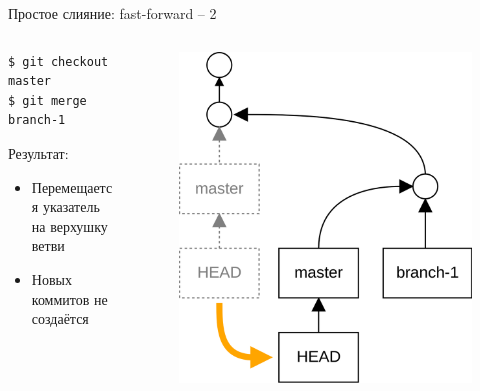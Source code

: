 \documentclass[presentation]{beamer}
\begin{document}
\begin{frame}[fragile]{Простое слияние: fast-forward -- 2}
  \begin{columns}
    \begin{column}{.4\textwidth}
\begin{verbatim}
$ git checkout master
$ git merge branch-1
\end{verbatim}
      Результат:
      \begin{itemize}
      \item Перемещается указатель на верхушку ветви
      \item Новых коммитов не создаётся
      \end{itemize}
      \end{column}
      \begin{column}{.6\textwidth}
        \begin{figure}[htb]
          \centering
          \includegraphics[height=.7\textheight]{git-operation-merge-1}
        \end{figure}
      \end{column}
    \end{columns}
\end{frame}
\end{document}
